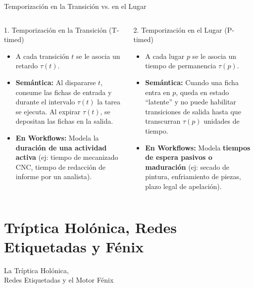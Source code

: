 \documentclass[10pt, aspectratio=169]{beamer}
\begin{document}
\begin{frame}{Temporización en la Transición vs. en el Lugar}
	\begin{columns}
		\begin{block}{1. Temporización en la Transición (T-timed)}
			\begin{itemize}
				\item A cada transición $t$ se le asocia un retardo $\tau(t)$.
				\item \textbf{Semántica:} Al dispararse $t$, consume las fichas de entrada y durante el intervalo $\tau(t)$ la tarea se ejecuta. Al expirar $\tau(t)$, se depositan las fichas en la salida.
				\item \textbf{En Workflows:} Modela la \textbf{duración de una actividad activa} (ej: tiempo de mecanizado CNC, tiempo de redacción de informe por un analista).
			\end{itemize}
		\end{block}

		\begin{block}{2. Temporización en el Lugar (P-timed)}
			\begin{itemize}
				\item A cada lugar $p$ se le asocia un tiempo de permanencia $\tau(p)$.
				\item \textbf{Semántica:} Cuando una ficha entra en $p$, queda en estado ``latente'' y no puede habilitar transiciones de salida hasta que transcurran $\tau(p)$ unidades de tiempo.
				\item \textbf{En Workflows:} Modela \textbf{tiempos de espera pasivos o maduración} (ej: secado de pintura, enfriamiento de piezas, plazo legal de apelación).
			\end{itemize}
		\end{block}
	\end{columns}
\end{frame}

\section{Tríptica Holónica, Redes Etiquetadas y Fénix}

\begin{frame}{}
	\centering
	\Huge{La Tríptica Holónica, \\ Redes Etiquetadas y el Motor Fénix}
\end{frame}
\end{document}

